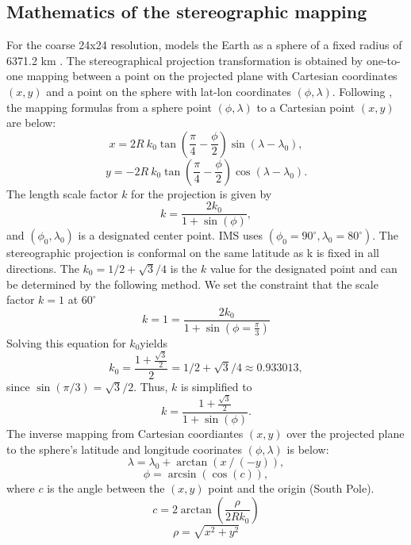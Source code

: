\subsection{Mathematics of the stereographic mapping}
For the coarse 24x24 resolution, models the Earth as a sphere of a fixed radius of 6371.2 km \cite{NIC}. The stereographical projection transformation is obtained by one-to-one mapping between a point on the projected plane with Cartesian coordinates $(x,y)$ and a point on the sphere with lat-lon coordinates $(\phi, \lambda)$. 
 Following \cite{snyder1987map}, the mapping formulas from a sphere point $(\phi, \lambda)$ to a Cartesian point $(x,y)$  are below:
\begin{equation}
x = 2R \ k_0 \tan (\frac{\pi}{4} - \frac{\phi}{2}) \sin (\lambda - \lambda_{0} ),
\end{equation}
\begin{equation}
y = -2R \ k_0 \tan (\frac{\pi}{4} - \frac{\phi}{2})\cos(\lambda - \lambda_{0}).
\end{equation}
The length scale factor $k$ for the projection is given by
\begin{equation} \label{eq:k spherical}
k = \frac{2k_{0}}{1+\sin(\phi)},
\end{equation}
and $(\phi_0,\lambda_0)$ is a designated center point. IMS uses $(\phi_0=90^\circ, \lambda_{0} = 80^{\circ})$.  The stereographic projection is conformal on the same 
latitude as k is fixed in all directions. The $k_0=1/2 + \sqrt{3}/4$ is the $k$ value for the designated point and can be determined by the following method.  We set the constraint 
that the scale factor $k=1$ at $60^{\circ}$ 
\begin{equation}\label{eq:k one}
k = 1 = \frac{2k_{0}}{1+\sin(\phi=\frac{\pi}{3})}
\end{equation}
Solving this equation for $k_{0}$yields
\begin{equation}
k_0 = \frac{1+\frac{\sqrt{3}}{2}}{2}=1/2 + \sqrt{3}/4 \approx 0.933013,
\end{equation}
since $\sin(\pi/3) = \sqrt{3}/2$. Thus, $k$ is simplified to
\begin{equation}
k = \frac{1+\frac{\sqrt{3}}{2}}{1+\sin(\phi)}.
\end{equation}
The inverse mapping from Cartesian coordiantes $(x,y)$ over 
the projected plane to the sphere's latitude and longitude 
coorinates $(\phi, \lambda)$ is below:
\begin{equation}
\lambda = \lambda_{0} + \arctan(x \ / \ (-y)),
\end{equation}
\begin{equation}
\phi = \arcsin(\cos(c)),
\end{equation}
where $c$ is the angle between the $(x,y)$ point and the origin (South Pole).
\begin{equation}
c = 2 \arctan(\frac{\rho}{2Rk_{0}})
\end{equation}
\begin{equation}
\rho = \sqrt{x^2 + y^2}
\end{equation}

